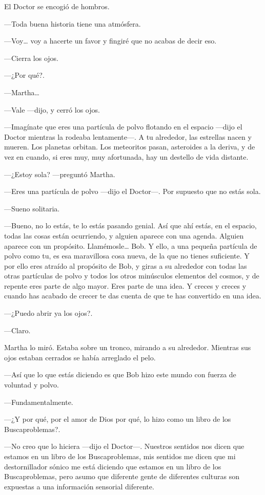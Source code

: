 El Doctor se encogió de hombros.

---Toda buena historia tiene una atmósfera.

---Voy\ldots{} voy a hacerte un favor y fingiré que no acabas de decir eso.

---Cierra los ojos.

---¿Por qué?.

---Martha\ldots{}

---Vale ---dijo, y cerró los ojos.

---Imagínate que eres una partícula de polvo flotando en el espacio ---dijo el Doctor mientras la rodeaba lentamente---. A tu alrededor, las estrellas nacen y mueren. Los planetas orbitan. Los meteoritos pasan, asteroides a la deriva, y de vez en cuando, si eres muy, muy afortunada, hay un destello de vida distante.

---¿Estoy sola? ---preguntó Martha.

---Eres una partícula de polvo ---dijo el Doctor---. Por supuesto que no estás sola.

---Sueno solitaria.

---Bueno, no lo estás, te lo estás pasando genial. Así que ahí estás, en el espacio, todas las cosas están ocurriendo, y alguien aparece con una agenda. Alguien aparece con un propósito. Llamémosle\ldots{} Bob. Y ello, a una pequeña partícula de polvo como tu, es esa maravillosa cosa nueva, de la que no tienes suficiente. Y por ello eres atraído al propósito de Bob, y giras a su alrededor con todas las otras partículas de polvo y todos los otros minúsculos elementos del cosmos, y de repente eres parte de algo mayor. Eres parte de una idea. Y creces y creces y cuando has acabado de crecer te das cuenta de que te has convertido en una idea.

---¿Puedo abrir ya los ojos?.

---Claro.

Martha lo miró. Estaba sobre un tronco, mirando a su alrededor. Mientras sus ojos estaban cerrados se había arreglado el pelo.

---Así que lo que estás diciendo es que Bob hizo este mundo con fuerza de voluntad y polvo.

---Fundamentalmente.

---¿Y por qué, por el amor de Dios por qué, lo hizo como un libro de los Buscaproblemas?.

---No creo que lo hiciera ---dijo el Doctor---. Nuestros sentidos nos dicen que estamos en un libro de los Buscaproblemas, mis sentidos me dicen que mi destornillador sónico me está diciendo que estamos en un libro de los Buscaproblemas, pero asumo que diferente gente de diferentes culturas son expuestas a una información sensorial diferente.

